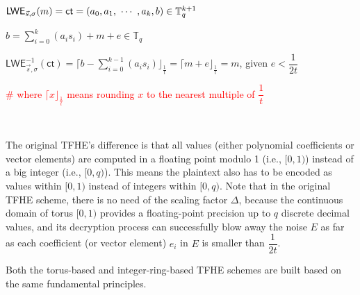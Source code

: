 $\textsf{LWE}_{\vec{s}, \sigma}(m) = \textsf{ct} = (a_0, a_1, \text{ } \text{$\cdots$} \text{ }, a_k, b) \in \mathbb{T}_{q}^{k+1}$

$b = \sum\limits_{i=0}^{k}(a_is_i) + m + e \in \mathbb{T}_q$

$\textsf{LWE}_{\vec{s}, \sigma}^{-1}(\textsf{ct}) =  \Big\lceil b - \sum\limits_{i=0}^{k-1}(a_is_i) \Big\rfloor_{\frac{1}{t}} = \Big\lceil m + e \Big\rfloor_{\frac{1}{t}} = m$, given $e < \dfrac{1}{2t}$  

\textcolor{red}{\# where $\lceil x \rfloor_{\frac{1}{t}}$ means rounding $x$ to the nearest multiple of $\dfrac{1}{t}$}

$ $

The original TFHE's difference is that all values (either polynomial coefficients or vector elements) are computed in a floating point modulo 1 (i.e., $[0, 1)$) instead of a big integer (i.e., $[0, q)$). This means the plaintext also has to be encoded as values within $[0, 1)$ instead of integers within $[0, q)$. Note that in the original TFHE scheme, there is no need of the scaling factor $\Delta$, because the continuous domain of torus $[0, 1)$ provides a floating-point precision up to $q$ discrete decimal values, and its decryption process can successfully blow away the noise $E$ as far as each coefficient (or vector element) $e_i$ in $E$ is smaller than $\dfrac{1}{2t}$. 

Both the torus-based and integer-ring-based TFHE schemes are built based on the same fundamental principles.